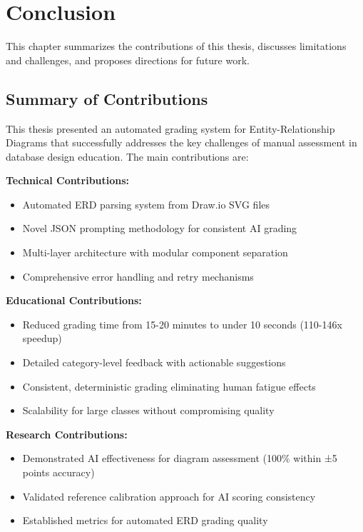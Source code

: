 \chapter{Conclusion}
\label{chap:conclusion}

This chapter summarizes the contributions of this thesis, discusses limitations and challenges, and proposes directions for future work.

\section{Summary of Contributions}

This thesis presented an automated grading system for Entity-Relationship Diagrams that successfully addresses the key challenges of manual assessment in database design education. The main contributions are:

\textbf{Technical Contributions:}
\begin{itemize}
\item Automated ERD parsing system from Draw.io SVG files
\item Novel JSON prompting methodology for consistent AI grading
\item Multi-layer architecture with modular component separation
\item Comprehensive error handling and retry mechanisms
\end{itemize}

\textbf{Educational Contributions:}
\begin{itemize}
\item Reduced grading time from 15-20 minutes to under 10 seconds (110-146x speedup)
\item Detailed category-level feedback with actionable suggestions
\item Consistent, deterministic grading eliminating human fatigue effects
\item Scalability for large classes without compromising quality
\end{itemize}

\textbf{Research Contributions:}
\begin{itemize}
\item Demonstrated AI effectiveness for diagram assessment (100\% within ±5 points accuracy)
\item Validated reference calibration approach for AI scoring consistency
\item Established metrics for automated ERD grading quality
\end{itemize}

